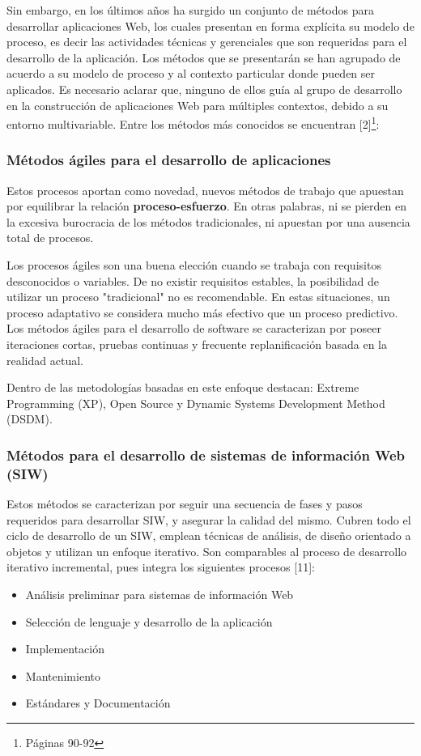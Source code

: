 Sin embargo, en los últimos años ha surgido un conjunto de métodos para desarrollar aplicaciones Web, los cuales presentan en forma
explícita su modelo de proceso, es decir las actividades técnicas y gerenciales que son requeridas para el
desarrollo de la aplicación. 
Los métodos que se presentarán se han agrupado de acuerdo a su modelo de proceso y al contexto particular donde pueden ser 
aplicados. Es necesario aclarar que, ninguno de ellos guía al grupo de desarrollo en la construcción de aplicaciones Web para múltiples 
contextos, debido a su entorno multivariable. Entre los métodos más conocidos se encuentran [2]\footnote{Páginas 90-92}:

\subsubsection{Métodos ágiles para el desarrollo de aplicaciones}
Estos procesos aportan como novedad, nuevos métodos de trabajo que apuestan por equilibrar la relación \textbf{proceso-esfuerzo}. 
En otras palabras, ni se pierden en la excesiva burocracia de los métodos tradicionales, ni apuestan por una ausencia total de procesos. 

Los procesos ágiles son una buena elección cuando se trabaja con requisitos desconocidos o variables. De no existir
requisitos estables, la posibilidad de utilizar un proceso "tradicional" no es recomendable. En estas situaciones, un 
proceso adaptativo se considera mucho más efectivo que un proceso predictivo. Los métodos ágiles para el desarrollo de software 
se caracterizan por poseer iteraciones cortas, pruebas continuas y frecuente replanificación basada en la realidad actual.

Dentro de las metodologías basadas en este enfoque destacan: Extreme Programming (XP), Open Source y Dynamic Systems 
Development Method (DSDM).


\subsubsection{Métodos para el desarrollo de sistemas de información Web (SIW) }
Estos métodos se caracterizan por seguir una secuencia de fases y pasos requeridos para desarrollar SIW, y asegurar la 
calidad del mismo. Cubren todo el ciclo de desarrollo de un SIW, emplean técnicas de análisis, de  diseño orientado
a objetos y utilizan un enfoque iterativo. 
Son comparables al proceso de desarrollo iterativo incremental, pues integra los siguientes procesos [11]:
\begin{itemize}
 \item Análisis preliminar para sistemas de información Web
 \item Selección de lenguaje y desarrollo de la aplicación
 \item Implementación
 \item Mantenimiento
 \item Estándares y Documentación
\end{itemize}

